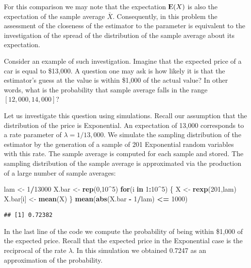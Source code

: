 \documentclass[]{krantz}
\makeatletter
\newenvironment{Shaded}{\begin{snugshade}}{\end{snugshade}}
\newcommand{\ControlFlowTok}[1]{\textcolor[rgb]{0.13,0.29,0.53}{\textbf{#1}}}
\newcommand{\DecValTok}[1]{\textcolor[rgb]{0.00,0.00,0.81}{#1}}
\newcommand{\KeywordTok}[1]{\textcolor[rgb]{0.13,0.29,0.53}{\textbf{#1}}}
\newcommand{\NormalTok}[1]{#1}
\newcommand{\OperatorTok}[1]{\textcolor[rgb]{0.81,0.36,0.00}{\textbf{#1}}}
\newcommand{\StringTok}[1]{\textcolor[rgb]{0.31,0.60,0.02}{#1}}
\newcommand{\Expec}{{\rm I\kern-.3em E}}
\newenvironment{kframe}{%
\medskip{}
\setlength{\fboxsep}{.8em}
 \def\at@end@of@kframe{}%
 \ifinner\ifhmode%
  \def\at@end@of@kframe{\end{minipage}}%
  \begin{minipage}{\columnwidth}%
 \fi\fi%
 \def\FrameCommand##1{\hskip\@totalleftmargin \hskip-\fboxsep
 \colorbox{shadecolor}{##1}\hskip-\fboxsep
     \hskip-\linewidth \hskip-\@totalleftmargin \hskip\columnwidth}%
 \MakeFramed {\advance\hsize-\width
   \@totalleftmargin\z@ \linewidth\hsize
   \@setminipage}}%
 {\par\unskip\endMakeFramed%
 \at@end@of@kframe}
\renewenvironment{Shaded}{\begin{kframe}}{\end{kframe}}
\theoremstyle{definition}
\theoremstyle{definition}
\theoremstyle{definition}
\theoremstyle{remark}
\makeatother
\begin{document}
For this comparison we may note that the expectation \(\Expec(X)\) is also
the expectation of the sample average \(\bar X\). Consequently, in this
problem the assessment of the closeness of the estimator to the
parameter is equivalent to the investigation of the spread of the
distribution of the sample average about its expectation.

Consider an example of such investigation. Imagine that the expected
price of a car is equal to \$13,000. A question one may ask is how
likely it is that the estimator's guess at the value is within \$1,000
of the actual value? In other words, what is the probability that sample
average falls in the range \([12,000, 14,000]\)?

Let us investigate this question using simulations. Recall our
assumption that the distribution of the price is Exponential. An
expectation of 13,000 corresponds to a rate parameter of
\(\lambda = 1/13,000\). We simulate the sampling distribution of the
estimator by the generation of a sample of 201 Exponential random
variables with this rate. The sample average is computed for each sample
and stored. The sampling distribution of the sample average is
approximated via the production of a large number of sample averages:

\begin{Shaded}
\begin{Highlighting}[]
\NormalTok{lam <-}\StringTok{ }\DecValTok{1}\OperatorTok{/}\DecValTok{13000}
\NormalTok{X.bar <-}\StringTok{ }\KeywordTok{rep}\NormalTok{(}\DecValTok{0}\NormalTok{,}\DecValTok{10}\OperatorTok{^}\DecValTok{5}\NormalTok{)}
\ControlFlowTok{for}\NormalTok{(i }\ControlFlowTok{in} \DecValTok{1}\OperatorTok{:}\DecValTok{10}\OperatorTok{^}\DecValTok{5}\NormalTok{) \{}
\NormalTok{  X <-}\StringTok{ }\KeywordTok{rexp}\NormalTok{(}\DecValTok{201}\NormalTok{,lam)}
\NormalTok{  X.bar[i] <-}\StringTok{ }\KeywordTok{mean}\NormalTok{(X)}
\NormalTok{\}}
\KeywordTok{mean}\NormalTok{(}\KeywordTok{abs}\NormalTok{(X.bar }\OperatorTok{-}\StringTok{ }\DecValTok{1}\OperatorTok{/}\NormalTok{lam) }\OperatorTok{<=}\StringTok{ }\DecValTok{1000}\NormalTok{)}
\end{Highlighting}
\end{Shaded}

\begin{verbatim}
## [1] 0.72382
\end{verbatim}

In the last line of the code we compute the probability of being within
\$1,000 of the expected price. Recall that the expected price in the
Exponential case is the reciprocal of the rate \(\lambda\). In this
simulation we obtained 0.7247 as an approximation of the probability.
\end{document}
